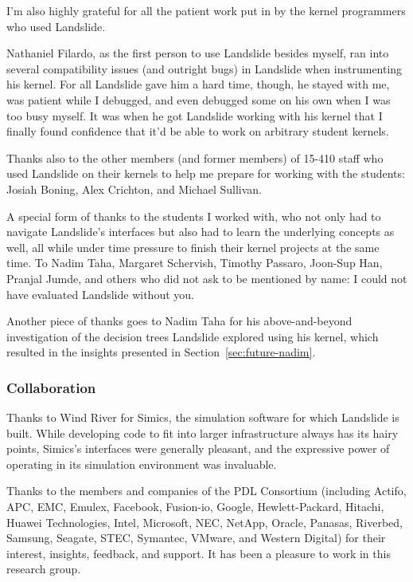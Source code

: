 I'm also highly grateful for all the patient work put in by the kernel programmers who used Landslide.

Nathaniel Filardo, as the first person to use Landslide besides myself, ran into several compatibility issues (and outright bugs) in Landslide when instrumenting his kernel. For all Landslide gave him a hard time, though, he stayed with me, was patient while I debugged, and even debugged some on his own when I was too busy myself. It was when he got Landslide working with his kernel that I finally found confidence that it'd be able to work on arbitrary student kernels.

Thanks also to the other members (and former members) of 15-410 staff who used Landslide on their kernels to help me prepare for working with the students: Josiah Boning, Alex Crichton, and Michael Sullivan.

A special form of thanks to the students I worked with, who not only had to navigate Landslide's interfaces but also had to learn the underlying concepts as well, all while under time pressure to finish their kernel projects at the same time. To Nadim Taha, Margaret Schervish, Timothy Passaro, Joon-Sup Han, Pranjal Jumde, and others who did not ask to be mentioned by name: I could not have evaluated Landslide without you.

Another piece of thanks goes to Nadim Taha for his above-and-beyond investigation of the decision trees Landslide explored using his kernel, which resulted in the insights presented in Section~\ref{sec:future-nadim}.

\subsubsection{Collaboration}

Thanks to Wind River for Simics\textsuperscript{\texttrademark}, the simulation software for which Landslide is built. While developing code to fit into larger infrastructure always has its hairy points, Simics's interfaces were generally pleasant, and the expressive power of operating in its simulation environment was invaluable.

Thanks to the members and companies of the PDL Consortium (including Actifo,
APC, EMC, Emulex, Facebook, Fusion-io, Google, Hewlett-Packard, Hitachi, Huawei
Technologies, Intel, Microsoft, NEC, NetApp, Oracle, Panasas, Riverbed,
Samsung, Seagate, STEC, Symantec, VMware, and Western Digital) for their
interest, insights, feedback, and support.
It has been a pleasure to work in this research group.

